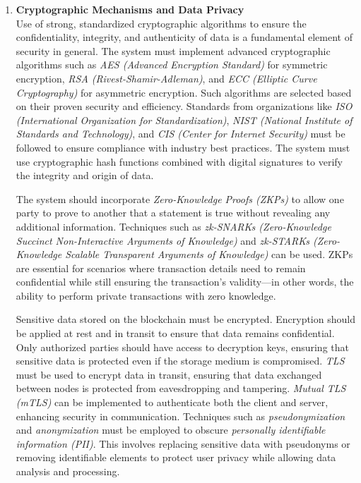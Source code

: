\begin{enumerate}[label=\textbullet]
	\item\textbf{Cryptographic Mechanisms and Data Privacy}\cite{sub_crypto}\cite{zkp_pub_85}\\
	Use of strong, standardized cryptographic algorithms to ensure the confidentiality, integrity, and authenticity of data is a fundamental element of security in general. The system must implement advanced cryptographic algorithms such as \textit{AES (Advanced Encryption Standard)} for symmetric encryption, \textit{RSA (Rivest-Shamir-Adleman)}, and \textit{ECC (Elliptic Curve Cryptography)} for asymmetric encryption. Such algorithms are selected based on their proven security and efficiency. Standards from organizations like \textit{ISO (International Organization for Standardization)}, \textit{NIST (National Institute of Standards and Technology)}, and \textit{CIS (Center for Internet Security)} must be followed to ensure compliance with industry best practices. The system must use cryptographic hash functions combined with digital signatures to verify the integrity and origin of data.
	
	The system should incorporate \textit{Zero-Knowledge Proofs (ZKPs)} to allow one party to prove to another that a statement is true without revealing any additional information. Techniques such as \textit{zk-SNARKs (Zero-Knowledge Succinct Non-Interactive Arguments of Knowledge)} and \textit{zk-STARKs (Zero-Knowledge Scalable Transparent Arguments of Knowledge)} can be used. ZKPs are essential for scenarios where transaction details need to remain confidential while still ensuring the transaction's validity—in other words, the ability to perform private transactions with zero knowledge.
	
	Sensitive data stored on the blockchain must be encrypted. Encryption should be applied at rest and in transit to ensure that data remains confidential. Only authorized parties should have access to decryption keys, ensuring that sensitive data is protected even if the storage medium is compromised. \textit{TLS} must be used to encrypt data in transit, ensuring that data exchanged between nodes is protected from eavesdropping and tampering. \textit{Mutual TLS (mTLS)} can be implemented to authenticate both the client and server, enhancing security in communication. Techniques such as \textit{pseudonymization} and \textit{anonymization} must be employed to obscure \textit{personally identifiable information (PII)}. This involves replacing sensitive data with pseudonyms or removing identifiable elements to protect user privacy while allowing data analysis and processing.


\end{enumerate}
